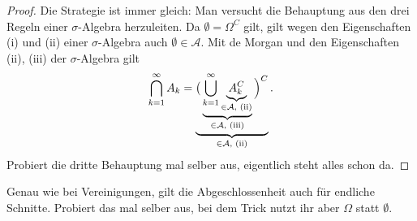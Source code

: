 \begin{proof}
	Die Strategie ist immer gleich: Man versucht die Behauptung aus den drei Regeln einer $\sigma$-Algebra herzuleiten. Da $\emptyset =\Omega^C$ gilt, gilt wegen den Eigenschaften (i) und (ii) einer $\sigma$-Algebra auch $\emptyset \in \mathcal A$. Mit de Morgan und den Eigenschaften (ii), (iii) der $\sigma$-Algebra gilt
	\begin{align*}
		\bigcap_{k=1}^\infty A_k =\underbrace{\big(\underbrace{\bigcup_{k=1}^\infty \underbrace{A_k^C}_{\in \mathcal A,\text{ (ii)}}}_{\in \mathcal A,\text{ (iii)}}\Big)^C}_{\in \mathcal{A},\text{ (ii)}}.
	\end{align*}
	Probiert die dritte Behauptung mal selber aus, eigentlich steht alles schon da.
\end{proof}
Genau wie bei Vereinigungen, gilt die Abgeschlossenheit auch f\"ur endliche Schnitte. Probiert das mal selber aus, bei dem Trick nutzt ihr aber $\Omega$ statt $\emptyset$.


